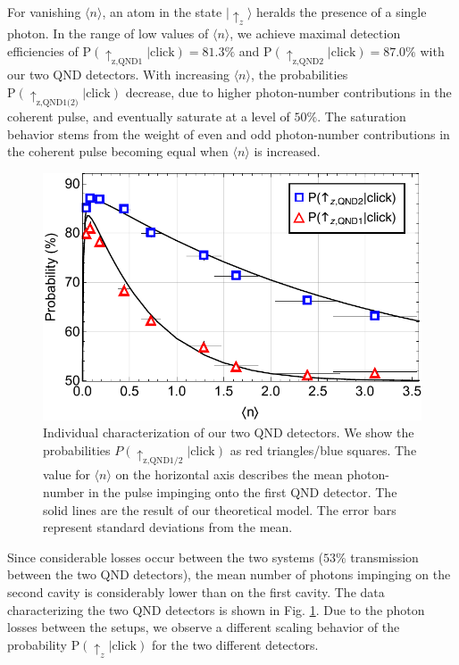 \documentclass[prl,amsmath,amssymb,bibnotes,aps,longbibliography,12pt]{revtex4-1}
\newcommand{\ket}[1]{|{#1}\rangle}
\newcommand{\braket}[1]{\langle{#1}\rangle}
\begin{document}
For vanishing $\braket{n}$, an atom in the state $\ket{\uparrow_z}$ heralds the presence of a single photon. In the range of low values of $\braket{n}$, we achieve maximal detection efficiencies of $\text{P}(\uparrow_{\text{z,QND1}}\vert\text{click})=81.3\%$ and $\text{P}(\uparrow_{\text{z,QND2}}\vert\text{click})=87.0\%$ with our two QND detectors. With increasing $\braket{n}$, the probabilities $\text{P}(\uparrow_{\text{z,QND1(2)}}\vert\text{click})$ decrease, due to higher photon-number contributions in the coherent pulse, and eventually saturate at a level of $50\%$. The saturation behavior stems from the weight of even and odd photon-number contributions in the coherent pulse becoming equal when $\braket{n}$ is increased.
\renewcommand{\thefigure}{S1}
\begin{figure}[b]
\centering
\includegraphics[width=\columnwidth]{FigS1.pdf} 
\caption{\label{fig:data1} Individual characterization of our two QND detectors. We show the probabilities $P(\uparrow_{\text{z,QND1/2}}\vert\text{click})$ as red triangles/blue squares. The value for $\braket{n}$ on the horizontal axis describes the mean photon-number in the pulse impinging onto the first QND detector. The solid lines are the result of our theoretical model. The error bars represent standard deviations from the mean.}
\end{figure}
Since considerable losses occur between the two systems ($53\%$ transmission between the two QND detectors), the mean number of photons impinging on the second cavity is considerably lower than on the first cavity. The data characterizing the two QND detectors is shown in Fig. \ref{fig:data1}. Due to the photon losses between the setups, we observe a different scaling behavior of the probability $\text{P}(\uparrow_z\vert \text{click})$ for the two different detectors.
\end{document}
